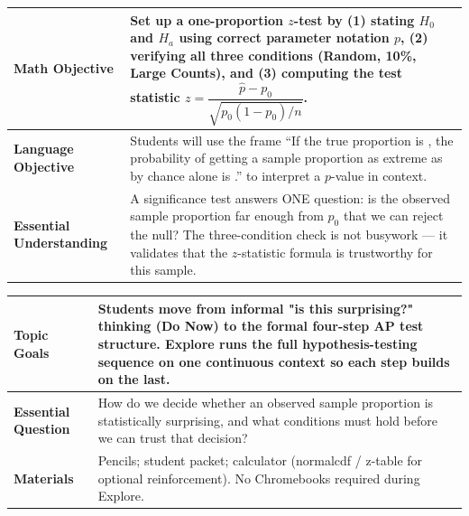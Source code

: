 \documentclass[11pt]{article}
\begin{document}

{\small
\renewcommand{\arraystretch}{1.25}
\noindent\begin{tabular}{|p{1.8in}|p{4.8in}|}
\hline
\textbf{Math Objective} & Set up a one-proportion \(z\)-test by (1) stating \(H_0\) and \(H_a\) using correct parameter notation \(p\), (2) verifying all three conditions (Random, 10\%, Large Counts), and (3) computing the test statistic \(z = \dfrac{\hat{p} - p_0}{\sqrt{p_0(1-p_0)/n}}\). \\ \hline
\textbf{Language Objective} & Students will use the frame ``If the true proportion is \underline{\hspace{1.1cm}}, the probability of getting a sample proportion as extreme as \underline{\hspace{1.1cm}} by chance alone is \underline{\hspace{1.1cm}}.'' to interpret a \(p\)-value in context. \\ \hline
\textbf{Essential Understanding} & A significance test answers ONE question: is the observed sample proportion far enough from \(p_0\) that we can reject the null? The three-condition check is not busywork --- it validates that the \(z\)-statistic formula is trustworthy for this sample. \\ \hline
\end{tabular}
}

{\small
\renewcommand{\arraystretch}{1.25}
\noindent\begin{tabular}{|p{1.8in}|p{4.8in}|}
\hline
\textbf{Topic Goals} & Students move from informal "is this surprising?" thinking (Do Now) to the formal four-step AP test structure. Explore runs the full hypothesis-testing sequence on one continuous context so each step builds on the last. \\ \hline
\textbf{Essential Question} & How do we decide whether an observed sample proportion is statistically surprising, and what conditions must hold before we can trust that decision? \\ \hline
\textbf{Materials} & Pencils; student packet; calculator (normalcdf / z-table for optional reinforcement). No Chromebooks required during Explore. \\ \hline
\end{tabular}
}

\end{document}
